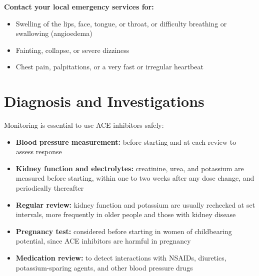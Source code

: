 \textbf{Contact your local emergency services for:}
\begin{itemize}
    \item Swelling of the lips, face, tongue, or throat, or difficulty breathing or swallowing (angioedema)
    \item Fainting, collapse, or severe dizziness
    \item Chest pain, palpitations, or a very fast or irregular heartbeat
\end{itemize}

\section*{Diagnosis and Investigations}
Monitoring is essential to use ACE inhibitors safely:

\begin{itemize}
    \item \textbf{Blood pressure measurement:} before starting and at each review to assess response
    \item \textbf{Kidney function and electrolytes:} creatinine, urea, and potassium are measured before starting, within one to two weeks after any dose change, and periodically thereafter
    \item \textbf{Regular review:} kidney function and potassium are usually rechecked at set intervals, more frequently in older people and those with kidney disease
    \item \textbf{Pregnancy test:} considered before starting in women of childbearing potential, since ACE inhibitors are harmful in pregnancy
    \item \textbf{Medication review:} to detect interactions with NSAIDs, diuretics, potassium-sparing agents, and other blood pressure drugs
\end{itemize}

